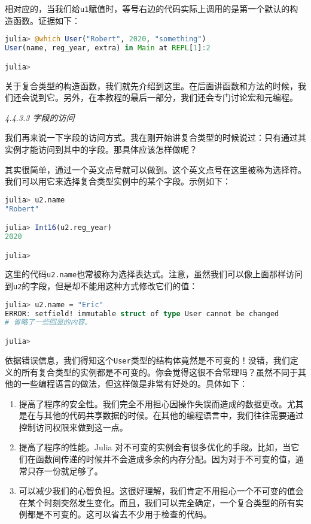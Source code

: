 相对应的，当我们给\verb|u1|赋值时，等号右边的代码实际上调用的是第一个默认的构造函数。证据如下：

\begin{lstlisting}[language=julia]
julia> @which User("Robert", 2020, "something")
User(name, reg_year, extra) in Main at REPL[1]:2

julia> 
\end{lstlisting}

关于复合类型的构造函数，我们就先介绍到这里。在后面讲函数和方法的时候，我们还会说到它。另外，在本教程的最后一部分，我们还会专门讨论宏和元编程。

\textsl{4.4.3.3 字段的访问}

我们再来说一下字段的访问方式。我在刚开始讲复合类型的时候说过：只有通过其实例才能访问到其中的字段。那具体应该怎样做呢？

其实很简单，通过一个英文点号就可以做到。这个英文点号在这里被称为选择符。我们可以用它来选择复合类型实例中的某个字段。示例如下：

\begin{lstlisting}[language=julia]
julia> u2.name
"Robert"

julia> Int16(u2.reg_year)
2020

julia> 
\end{lstlisting}

这里的代码\verb|u2.name|也常被称为选择表达式。注意，虽然我们可以像上面那样访问到\verb|u2|的字段，但是却不能用这种方式修改它们的值：

\begin{lstlisting}[language=julia]
julia> u2.name = "Eric"
ERROR: setfield! immutable struct of type User cannot be changed
# 省略了一些回显的内容。

julia> 
\end{lstlisting}

依据错误信息，我们得知这个\verb|User|类型的结构体竟然是不可变的！没错，我们定义的所有复合类型的实例都是不可变的。你会觉得这很不合常理吗？虽然不同于其他的一些编程语言的做法，但这样做是非常有好处的。具体如下：

\begin{enumerate}
\item 提高了程序的安全性。我们完全不用担心因操作失误而造成的数据更改。尤其是在与其他的代码共享数据的时候。在其他的编程语言中，我们往往需要通过控制访问权限来做到这一点。
\item 提高了程序的性能。Julia 对不可变的实例会有很多优化的手段。比如，当它们在函数间传递的时候并不会造成多余的内存分配。因为对于不可变的值，通常只存一份就足够了。
\item 可以减少我们的心智负担。这很好理解，我们肯定不用担心一个不可变的值会在某个时刻突然发生变化。而且，我们可以完全确定，一个复合类型的所有实例都是不可变的。这可以省去不少用于检查的代码。
\end{enumerate}

